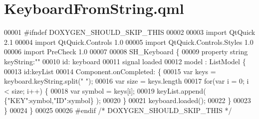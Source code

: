 \hypertarget{KeyboardFromString_8qml}{\section{Keyboard\-From\-String.\-qml}
\label{KeyboardFromString_8qml}
}

\begin{DoxyCode}
00001 \textcolor{preprocessor}{#ifndef DOXYGEN\_SHOULD\_SKIP\_THIS}
00002 \textcolor{preprocessor}{}
00003 \textcolor{keyword}{import} QtQuick 2.1
00004 import QtQuick.Controls 1.0
00005 import QtQuick.Controls.Styles 1.0
00006 import PreCheck 1.0
00007 
00008 SH\_Keyboard \{
00009     \textcolor{keyword}{property} \textcolor{keywordtype}{string} keyString:\textcolor{stringliteral}{""}
00010     \textcolor{keywordtype}{id}: keyboard
00011     signal loaded
00012     model : ListModel \{
00013         \textcolor{keywordtype}{id}:keyList
00014         Component.onCompleted: \{
00015             var keys = keyboard.keyString.split(\textcolor{stringliteral}{" "});
00016             var size = keys.length
00017             \textcolor{keywordflow}{for}(var i = 0; i < size; i++) \{
00018                 var symbol = keys[i];
00019                 keyList.append( \{\textcolor{stringliteral}{"KEY"}:symbol,\textcolor{stringliteral}{"ID"}:symbol\} );
00020             \}
00021             keyboard.loaded();
00022         \}
00023     \}
00024 \}
00025 
00026 \textcolor{preprocessor}{#endif }\textcolor{comment}{/* DOXYGEN\_SHOULD\_SKIP\_THIS */}\textcolor{preprocessor}{}
\end{DoxyCode}
